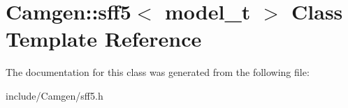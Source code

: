 \hypertarget{a00492}{\section{Camgen\-:\-:sff5$<$ model\-\_\-t $>$ Class Template Reference}
\label{a00492}
}


The documentation for this class was generated from the following file\-:\begin{DoxyCompactItemize}
\item 
include/\-Camgen/sff5.\-h\end{DoxyCompactItemize}
